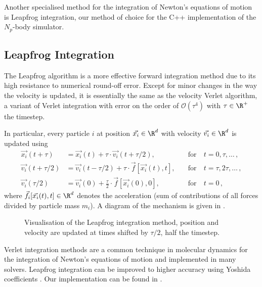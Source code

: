 Another specialised method for the integration of Newton's equations of motion is Leapfrog integration, our method of choice for the C++ implementation of the $N_p$-body simulator.

\subsection{Leapfrog Integration}
The Leapfrog algorithm is a more effective forward integration method due to its high resistance to numerical round-off error.
Except for minor changes in the way the velocity is updated, it is essentially the same as the velocity Verlet algorithm, a variant of Verlet integration with error on the order of $\mathcal{O}(\tau^4)$ with $\tau \in \R^+$ the timestep.

In particular, every particle $i$ at position $\vec{x_i} \in \R^d$ with velocity $\vec{v_i} \in \R^d$ is updated using
\begin{align*}
  \vec{x_i}(t+\tau)     & = \vec{x_i}(t)+\tau \cdot \vec{v_i}(t+\tau / 2),              & \quad\text{for}~ & t=0, \tau, \ldots\,,      \\
  \vec{v_i}(t+\tau / 2) & = \vec{v_i}(t-\tau/2) + \tau \cdot \vec{f}[\vec{x_i}(t), t],  & \quad\text{for}~ & t=\tau, 2 \tau, \ldots\,, \\
  \vec{v_i}(\tau / 2)   & = \vec{v_i}(0)+\frac{\tau}{2} \cdot \vec{f}[\vec{x_i}(0), 0], & \quad\text{for}~ & t=0\,,
\end{align*}
where $\vec{f_i}[\vec{x_i}(t), t] \in \R^d$ denotes the acceleration (sum of contributions of all forces divided by particle mass $m_i$).
A diagram of the mechanism is given in .

\begin{figure}[H]
  \centering
  \caption[Leapfrog Visualisation]{Visualisation of the Leapfrog integration method, position and velocity are updated at times shifted by $\tau/2$, half the timestep.}
  \label{fig:leapfrog}
\end{figure}

Verlet integration methods are a common technique in molecular dynamics for the integration of Newton's equations of motion and implemented in many solvers.
Leapfrog integration can be improved to higher accuracy using Yoshida coefficients \parencite{1973-yoshida-coefficients}.
Our implementation can be found in .


